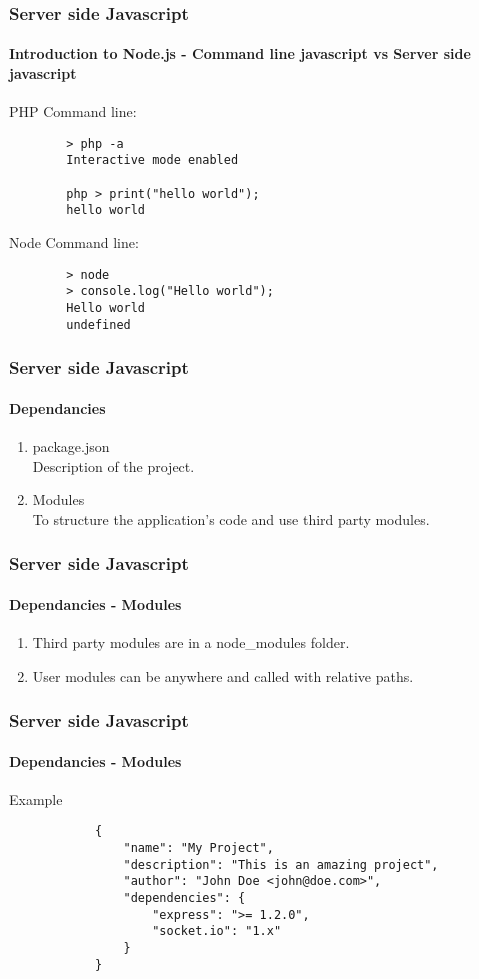 \documentclass{beamer}
\begin{document}
	\begin{frame}[fragile]
		\frametitle{Server side Javascript}
		\framesubtitle{Introduction to Node.js - Command line javascript vs Server side javascript}

		PHP Command line:
		\begin{verbatim}
		> php -a
		Interactive mode enabled

		php > print("hello world");
		hello world
		\end{verbatim}

		Node Command line:
		\begin{verbatim}
		> node
		> console.log("Hello world");
		Hello world
		undefined
		\end{verbatim}
	\end{frame}


	\begin{frame}
		\frametitle{Server side Javascript}
		\framesubtitle{Dependancies}
		\begin{enumerate}
			\item package.json \\
				Description of the project.
			\item Modules \\
				To structure the application's code and use third party modules.
		\end{enumerate}
	\end{frame}

	\begin{frame}
		\frametitle{Server side Javascript}
		\framesubtitle{Dependancies - Modules}

		\begin{enumerate}
			\item Third party modules are in a node\_modules folder.
			\item User modules can be anywhere and called with relative paths.
		\end{enumerate}
	\end{frame}

	\begin{frame}[fragile]
		\frametitle{Server side Javascript}
		\framesubtitle{Dependancies - Modules}
		Example
		\begin{verbatim}
			{
			    "name": "My Project",
			    "description": "This is an amazing project",
			    "author": "John Doe <john@doe.com>",
			    "dependencies": {
			        "express": ">= 1.2.0",
			        "socket.io": "1.x"
			    }
			}
		\end{verbatim}
	\end{frame}
\end{document}

